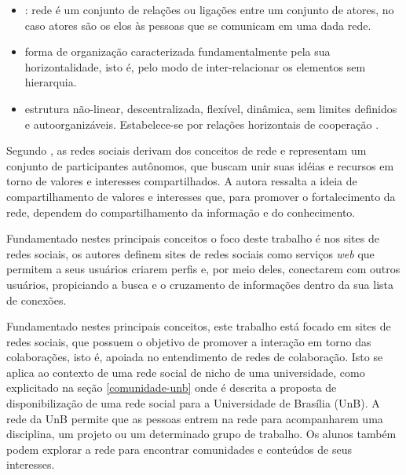 \begin{itemize}
\item {}: rede é um conjunto de relações ou ligações entre um conjunto de atores, no caso atores são os elos às pessoas que se comunicam em uma dada rede.

\item {} forma de organização caracterizada fundamentalmente pela sua horizontalidade, isto é, pelo modo de inter-relacionar os elementos sem hierarquia.

\item {} estrutura não-linear, descentralizada, flexível, dinâmica, sem limites definidos e autoorganizáveis. Estabelece-se por relações horizontais de cooperação .

\end{itemize}

Segundo \cite{marteleto2001analise}, as redes sociais derivam dos conceitos de rede e representam um conjunto de participantes autônomos, que buscam unir suas idéias e recursos em torno de valores e interesses compartilhados. A autora ressalta a ideia de compartilhamento de valores e interesses que, para promover o fortalecimento da rede, dependem do compartilhamento da informação e do conhecimento.

Fundamentado nestes principais conceitos o foco deste trabalho é nos sites de redes sociais, os autores  definem sites de redes sociais como serviços \textit{web} que permitem a seus usuários criarem perfis e, por meio deles, conectarem com outros usuários, propiciando a busca e o cruzamento de informações dentro da sua lista de conexões.

Fundamentado nestes principais conceitos, este trabalho está focado em sites de redes sociais, que possuem o objetivo de promover a interação em torno das colaborações, isto é, apoiada no entendimento de redes de colaboração. Isto se aplica ao contexto de uma rede social de nicho de uma universidade, como explicitado na seção \ref{comunidade-unb} onde é descrita a proposta de disponibilização de uma rede social para a Universidade de Brasília (UnB). A rede da UnB permite que as pessoas entrem na rede para acompanharem uma disciplina, um projeto ou um determinado grupo de trabalho. Os alunos também podem explorar a rede para encontrar comunidades e conteúdos de seus interesses.

